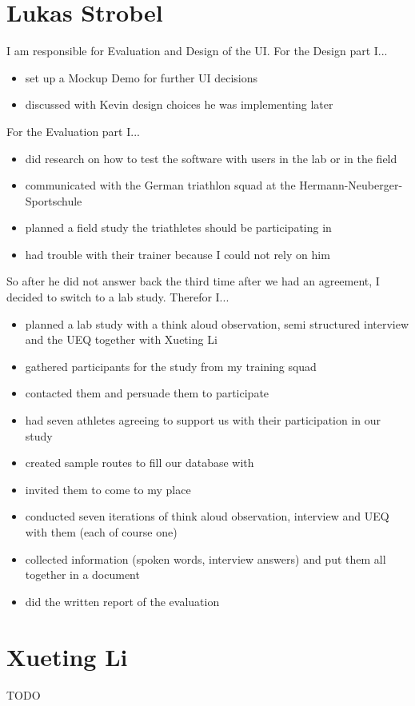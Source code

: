 \documentclass{sigchi}
\begin{document}
\section{Lukas Strobel}
I am responsible for Evaluation and Design of the UI.
For the Design part I...
\begin{itemize}
\item set up a Mockup Demo for further UI decisions
\item discussed with Kevin design choices he was implementing later
\end{itemize}
For the Evaluation part I...
\begin{itemize}
\item did research on how to test the software with users in the lab or in the field
\item communicated with the German triathlon squad at the Hermann-Neuberger-Sportschule
\item planned a field study the triathletes should be participating in
\item had trouble with their trainer because I could not rely on him
\end{itemize}
So after he did not answer back the third time after we had an agreement, I decided to switch to a lab study. Therefor I...
\begin{itemize}
\item planned a lab study with a think aloud observation, semi structured interview and the UEQ together with Xueting Li
\item gathered participants for the study from my training squad
\item contacted them and persuade them to participate
\item had seven athletes agreeing to support us with their participation in our study
\item created sample routes to fill our database with
\item invited them to come to my place
\item conducted seven iterations of think aloud observation, interview and UEQ with them (each of course one)
\item collected information (spoken words, interview answers) and put them all together in a document
\item did the written report of the evaluation 
\end{itemize}

\section{Xueting Li}
TODO

\balance{}
\end{document}

